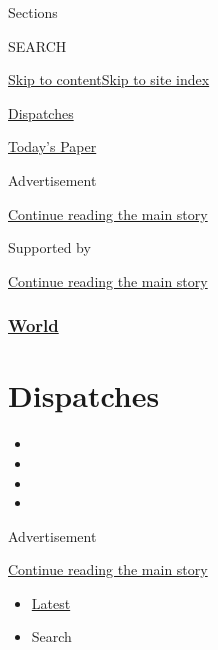 Sections

SEARCH

\protect\hyperlink{site-content}{Skip to
content}\protect\hyperlink{site-index}{Skip to site index}

\href{https://www.nytimes3xbfgragh.onion/spotlight/dispatches-international}{Dispatches}

\href{https://myaccount.nytimes3xbfgragh.onion/auth/login?response_type=cookie\&client_id=vi}{}

\href{https://www.nytimes3xbfgragh.onion/section/todayspaper}{Today's
Paper}

Advertisement

\protect\hyperlink{after-top}{Continue reading the main story}

Supported by

\protect\hyperlink{after-sponsor}{Continue reading the main story}

\hypertarget{world}{%
\subsubsection{\texorpdfstring{\href{/section/world}{World}}{World}}\label{world}}

\hypertarget{dispatches}{%
\section{Dispatches}\label{dispatches}}

\begin{itemize}
\item
\item
\item
\item
\end{itemize}

Advertisement

\protect\hyperlink{after-subheader}{Continue reading the main story}

\begin{itemize}
\tightlist
\item
  \protect\hyperlink{stream-panel}{Latest}
\item
  Search
\end{itemize}

